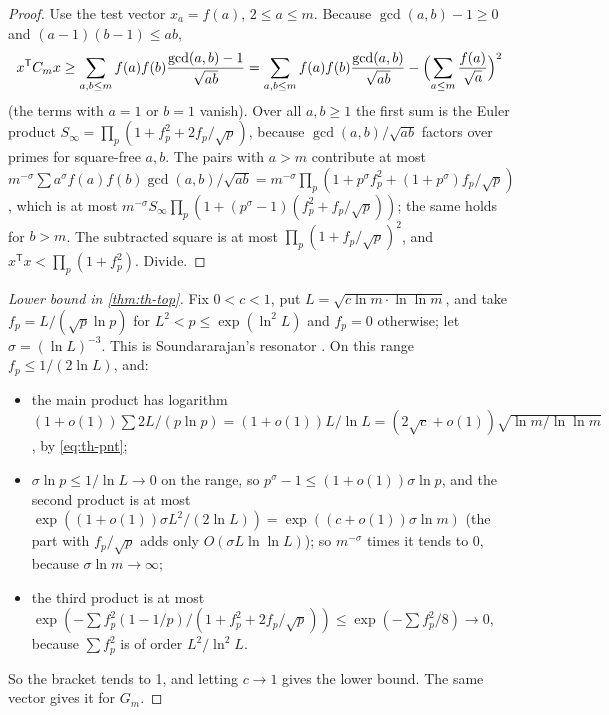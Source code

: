 \begin{proof}
Use the test vector $x_a = f(a)$, $2 \le a \le m$. Because $\gcd(a,b) - 1 \ge 0$ and $(a-1)(b-1) \le ab$,
\[
  x^{\mathsf T}C_mx \ge \sum_{a,b \le m}f(a)f(b)\frac{\gcd(a,b) - 1}{\sqrt{ab}} = \sum_{a,b \le m}f(a)f(b)\frac{\gcd(a,b)}{\sqrt{ab}} - \Bigl(\sum_{a \le m}\frac{f(a)}{\sqrt a}\Bigr)^2
\]
(the terms with $a = 1$ or $b = 1$ vanish). Over all $a, b \ge 1$ the first sum is the Euler product $S_\infty = \prod_p(1 + f_p^2 + 2f_p/\sqrt p)$, because $\gcd(a,b)/\sqrt{ab}$ factors over primes for square-free $a, b$. The pairs with $a > m$ contribute at most $m^{-\sigma}\sum a^\sigma f(a)f(b)\gcd(a,b)/\sqrt{ab} = m^{-\sigma}\prod_p(1 + p^\sigma f_p^2 + (1 + p^\sigma)f_p/\sqrt p)$, which is at most $m^{-\sigma}S_\infty\prod_p(1 + (p^\sigma - 1)(f_p^2 + f_p/\sqrt p))$; the same holds for $b > m$. The subtracted square is at most $\prod_p(1 + f_p/\sqrt p)^2$, and $x^{\mathsf T}x < \prod_p(1 + f_p^2)$. Divide.
\end{proof}

\begin{proof}[Lower bound in \cref{thm:th-top}]
Fix $0 < c < 1$, put $L = \sqrt{c\ln m\cdot\ln\ln m}$, and take $f_p = L/(\sqrt p\ln p)$ for $L^2 < p \le \exp(\ln^2L)$ and $f_p = 0$ otherwise; let $\sigma = (\ln L)^{-3}$. This is Soundararajan's resonator \citep{Soundararajan2008}. On this range $f_p \le 1/(2\ln L)$, and:
\begin{itemize}
\item the main product has logarithm $(1 + o(1))\sum 2L/(p\ln p) = (1 + o(1))L/\ln L = (2\sqrt c + o(1))\sqrt{\ln m/\ln\ln m}$, by \eqref{eq:th-pnt};
\item $\sigma\ln p \le 1/\ln L \to 0$ on the range, so $p^\sigma - 1 \le (1 + o(1))\sigma\ln p$, and the second product is at most $\exp((1 + o(1))\sigma L^2/(2\ln L)) = \exp((c + o(1))\sigma\ln m)$ (the part with $f_p/\sqrt p$ adds only $O(\sigma L\ln\ln L)$); so $m^{-\sigma}$ times it tends to $0$, because $\sigma\ln m \to \infty$;
\item the third product is at most $\exp(-\sum f_p^2(1 - 1/p)/(1 + f_p^2 + 2f_p/\sqrt p)) \le \exp(-\sum f_p^2/8) \to 0$, because $\sum f_p^2$ is of order $L^2/\ln^2L$.
\end{itemize}
So the bracket tends to 1, and letting $c \to 1$ gives the lower bound. The same vector gives it for $G_m$.
\end{proof}

